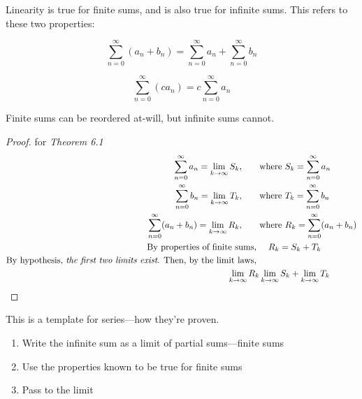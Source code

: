 \documentclass[../13.tex]{subfiles}
\begin{document}
Linearity is true for finite sums, and is also true for infinite sums. This refers to these two properties:\\
\begin{minipage}{0.5\linewidth}
    \begin{equation*}
        {\sum_{n = 0}^{\infty} (a_n + b_n) = \sum_{n = 0}^{\infty} a_n + \sum_{n = 0}^{\infty} b_n}
    \end{equation*}
\end{minipage}
\begin{minipage}{0.5\linewidth}
    \begin{equation*}
        {\sum_{n = 0}^{\infty} (ca_n)= c \sum_{n = 0}^{\infty} a_n}
    \end{equation*}
\end{minipage}
Finite sums can be reordered at-will, but infinite sums cannot.


\begin{proof} for \emph{Theorem 6.1}
    \begin{align*}
        \sum_{n = 0}^{\infty} a_n = \lim_{k\to\infty} S_k, \qquad         & \text{where } S_k = \sum_{n = 0}^{\infty} a_n         \\
        \sum_{n = 0}^{\infty} b_n = \lim_{k\to\infty} T_k, \qquad         & \text{where } T_k = \sum_{n = 0}^{\infty} b_n         \\
        \sum_{n = 0}^{\infty} (a_n + b_n) = \lim_{k\to\infty} R_k, \qquad & \text{where } R_k = \sum_{n = 0}^{\infty} (a_n + b_n) \\
        \text{By properties of finite sums, }                             & \quad R_k = S_k + T_k                                 \\
        \text{By hypothesis, \emph{the first two limits exist}. Then, by the limit laws, }                                        \\
        \lim_{k\to\infty} R_k                                             & \lim_{k\to\infty} S_k + \lim_{k\to\infty} T_k
    \end{align*}
\end{proof}

This is a template for series---how they're proven. \begin{enumerate}
    \item Write the infinite sum as a limit of partial sums---finite sums
    \item Use the properties known to be true for finite sums
    \item Pass to the limit
\end{enumerate}

\newpage
\end{document}
